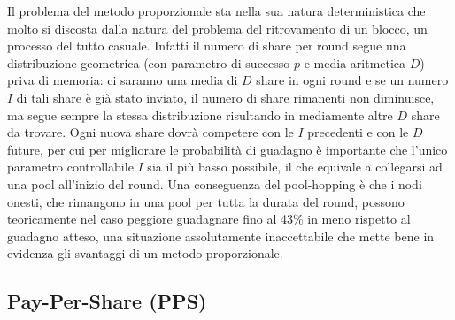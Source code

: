 Il problema del metodo proporzionale sta nella sua natura deterministica che molto si discosta dalla natura del problema del ritrovamento di un blocco, un processo del tutto casuale. Infatti il numero di share per round segue una distribuzione geometrica (con parametro di successo $p$ e media aritmetica $D$) priva di memoria: ci saranno una media di $D$ share in ogni round e se un numero $I$ di tali share è già stato inviato, il numero di share rimanenti non diminuisce, ma segue sempre la stessa distribuzione risultando in mediamente altre $D$ share da trovare. Ogni nuova share dovrà competere con le $I$ precedenti e con le $D$ future, per cui per migliorare le probabilità di guadagno è importante che l'unico parametro controllabile $I$ sia il più basso possibile, il che equivale a collegarsi ad una pool all'inizio del round.
Una conseguenza del pool-hopping è che i nodi onesti, che rimangono in una pool per tutta la durata del round, possono teoricamente nel caso peggiore guadagnare fino al 43\% in meno rispetto al guadagno atteso, una situazione assolutamente inaccettabile che mette bene in evidenza gli svantaggi di un metodo proporzionale.

\subsection{Pay-Per-Share (PPS)}

